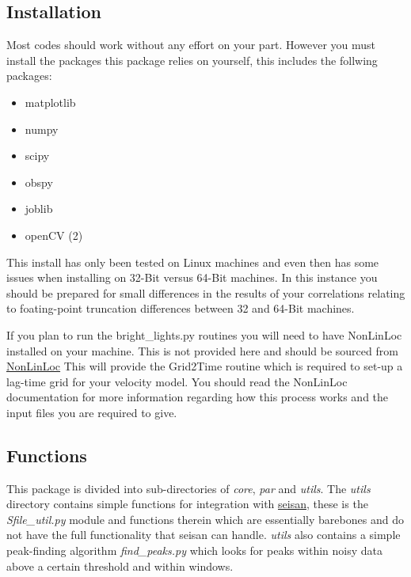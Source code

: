 \documentclass[a4paper,10pt,english]{sphinxmanual}
\begin{document}
\subsection{Installation}
\label{intro:installation}
Most codes should work without any effort on your part.  However you must
install the packages this package relies on yourself, this includes the follwing
packages:
\begin{itemize}
\item {} 
matplotlib

\item {} 
numpy

\item {} 
scipy

\item {} 
obspy

\item {} 
joblib

\item {} 
openCV (2)

\end{itemize}

This install has only been tested on Linux machines and even then has some
issues when installing on 32-Bit versus 64-Bit machines.  In this instance you
should be prepared for small differences in the results of your correlations
relating to foating-point truncation differences between 32 and 64-Bit
machines.

If you plan to run the bright\_lights.py routines you will need to have
NonLinLoc installed on your machine.  This is not provided here and should
be sourced from \href{http://alomax.free.fr/nlloc/}{NonLinLoc} This will provide
the Grid2Time routine which is required to set-up a lag-time grid for your
velocity model.  You should read the NonLinLoc documentation for more
information regarding how this process works and the input files you are
required to give.


\subsection{Functions}
\label{intro:functions}
This package is divided into sub-directories of \emph{core}, \emph{par} and \emph{utils}.  The
\emph{utils} directory contains simple functions for integration with
\href{http://seisan.info/}{seisan}, these is the \emph{Sfile\_util.py}
module and functions therein which are essentially barebones and do not have the
full functionality that seisan can handle.  \emph{utils} also contains a simple
peak-finding algorithm \emph{find\_peaks.py} which looks for peaks within noisy data
above a certain threshold and within windows.
\end{document}
